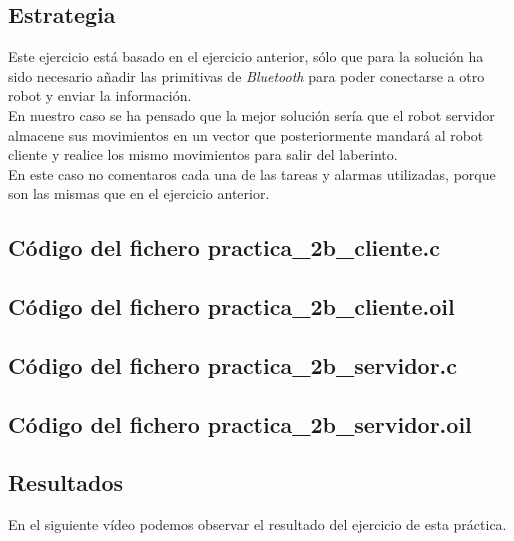 \subsection{Estrategia}
Este ejercicio está basado en el ejercicio anterior, sólo que para la solución ha sido necesario añadir las primitivas de \textit{Bluetooth} para poder conectarse a otro robot y enviar la información.\\

En nuestro caso se ha pensado que la mejor solución sería que el robot servidor almacene sus movimientos en un vector que posteriormente mandará al robot cliente y realice los mismo movimientos para salir del laberinto.\\

En este caso no comentaros cada una de las tareas y alarmas utilizadas, porque son las mismas que en el ejercicio anterior.


\subsection{Código del fichero practica\_2b\_cliente.c}


\subsection{Código del fichero practica\_2b\_cliente.oil}


\subsection{Código del fichero practica\_2b\_servidor.c}


\subsection{Código del fichero practica\_2b\_servidor.oil}


\subsection{Resultados}
En el siguiente vídeo podemos observar el resultado del ejercicio de esta práctica.\\

